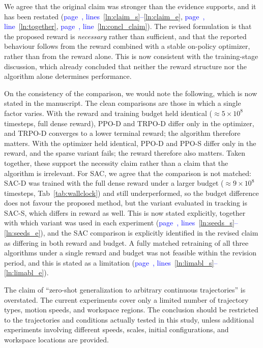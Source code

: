 \documentclass[11pt]{elsarticle}
\newcommand{\mline}[1]{\textcolor{blue}{page~\pageref{#1}, line~\ref{#1}}}
\newcommand{\mlines}[2]{\textcolor{blue}{page~\pageref{#1}, lines~\ref{#1}--\ref{#2}}}
\begin{document}
\begin{responsebox}
We agree that the original claim was stronger than the evidence supports, and it has been restated (\mlines{ln:claim_s}{ln:claim_e}, \mline{ln:together}, \mline{ln:concl_claim}). The revised formulation is that the proposed reward is \emph{necessary} rather than sufficient, and that the reported behaviour follows from the reward combined with a stable on-policy optimizer, rather than from the reward alone. This is now consistent with the training-stage discussion, which already concluded that neither the reward structure nor the algorithm alone determines performance.

On the consistency of the comparison, we would note the following, which is now stated in the manuscript. The clean comparisons are those in which a single factor varies. With the reward and training budget held identical ($\approx5\times10^{8}$ timesteps, full dense reward), PPO-D and TRPO-D differ only in the optimizer, and TRPO-D converges to a lower terminal reward; the algorithm therefore matters. With the optimizer held identical, PPO-D and PPO-S differ only in the reward, and the sparse variant fails; the reward therefore also matters. Taken together, these support the necessity claim rather than a claim that the algorithm is irrelevant. For SAC, we agree that the comparison is not matched: SAC-D was trained with the full dense reward under a larger budget ($\approx9\times10^{8}$ timesteps, Tab~\ref{tab:wallclock}) and still underperformed, so the budget difference does not favour the proposed method, but the variant evaluated in tracking is SAC-S, which differs in reward as well. This is now stated explicitly, together with which variant was used in each experiment (\mlines{ln:seeds_s}{ln:seeds_e}), and the SAC comparison is explicitly identified in the revised claim as differing in both reward and budget. A fully matched retraining of all three algorithms under a single reward and budget was not feasible within the revision period, and this is stated as a limitation (\mlines{ln:limabl_s}{ln:limabl_e}).
\end{responsebox}

\begin{reviewerbox}[Comment R1.11]
The claim of ``zero-shot generalization to arbitrary continuous trajectories'' is overstated. The current experiments cover only a limited number of trajectory types, motion speeds, and workspace regions. The conclusion should be restricted to the trajectories and conditions actually tested in this study, unless additional experiments involving different speeds, scales, initial configurations, and workspace locations are provided.
\end{reviewerbox}
\end{document}
